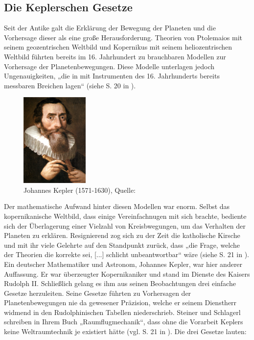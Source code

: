 \subsection{Die Keplerschen Gesetze}
\label{subsec:kepler}
Seit der Antike galt die Erklärung der Bewegung der Planeten und die Vorhersage dieser als eine große Herausforderung. Theorien von Ptolemaios mit seinem geozentrischen Weltbild und Kopernikus mit seinem heliozentrischen Weltbild führten bereits im 16. Jahrhundert zu brauchbaren Modellen zur Vorhersage der Planetenbewegungen. Diese Modelle unterlagen jedoch Ungenauigkeiten, „die in mit Instrumenten des 16. Jahrhunderts bereits messbaren Breichen lagen“ (siehe S. 20 in \cite{Raumflugm}). 
\begin{figure}[h]                                                                           %
	\centering                                                                            	%
	\includegraphics[width=0.3\textwidth]{./images/kepler.jpg}                              %
	\caption[Bahnelemente]{Johannes Kepler (1571-1630), Quelle: \cite{Wiki:Kepler}}         %
	\label{fig:kepler}                                                                %
\end{figure}                                                                              	%
Der mathematische Aufwand hinter diesen Modellen war enorm. Selbst das kopernikanische Weltbild, dass einige Vereinfachnugen mit sich brachte, bediente sich der Überlagerung einer Vielzahl von Kreisbwegungen, um das Verhalten der Planeten zu erklären. Resignierend zog sich zu der Zeit die katholische Kirsche und mit ihr viele Gelehrte auf den Standpunkt zurück, dass „die Frage, welche der Theorien die korrekte sei, [...] schlicht unbeantwortbar“ wäre (siehe S. 21 in \cite{Raumflugm}). 
\newpar
Ein deutscher Mathematiker und Astronom, Johannes Kepler, war hier anderer Auffassung. Er war überzeugter Kopernikaniker und stand im Dienste des Kaisers Rudolph II. Schließlich gelang es ihm aus seinen Beobachtungen drei einfache Gesetze herzuleiten. Seine Gesetze führten zu Vorhersagen der Planetenbewegungen nie da gewesener Präzision, welche er seinem Dienstherr widmend in den Rudolphinischen Tabellen niederschrieb. Steiner und Schlagerl schreiben in Ihrem Buch „Raumflugmechanik“, dass ohne die Vorarbeit Keplers keine Weltraumtechnik je existiert hätte (vgl. S. 21 in \cite{Raumflugm}). Die drei Gesetze lauten:
